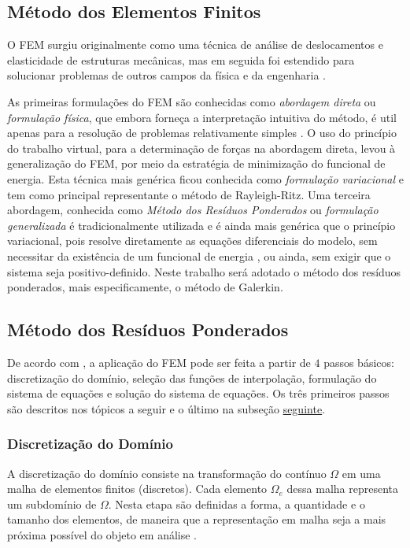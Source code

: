 \documentclass[
    12pt,               %
    openright,          %
    oneside,
    a4paper,            %
    english,            %
    french,             %
    spanish,            %
    brazil              %
    ]{abntex2}
\begin{document}
\subsection{Método dos Elementos Finitos}

O FEM surgiu originalmente como uma técnica de análise de deslocamentos e elasticidade de estruturas mecânicas, mas em seguida foi estendido para solucionar problemas de outros campos da física e da engenharia \cite{jin, desai, zien}.

As primeiras formulações do FEM são conhecidas como \textit{abordagem direta} ou \textit{formulação física}, que embora forneça a interpretação intuitiva do método, é util apenas para a resolução de problemas relativamente simples \cite{huebner, desai, zien}. O uso do princípio do trabalho virtual, para a determinação de forças na abordagem direta, levou à generalização do FEM, por meio da estratégia de minimização do funcional de energia. Esta técnica mais genérica  ficou conhecida como \textit{formulação variacional} \cite{desai, zien, jin} e tem como principal representante o método de Rayleigh-Ritz. Uma terceira abordagem, conhecida como \textit{Método dos Resíduos Ponderados} ou \textit{formulação generalizada} \cite{zien, huebner} é tradicionalmente utilizada e é ainda mais genérica que o princípio variacional, pois resolve diretamente as equações diferenciais do modelo, sem necessitar da existência de um funcional de energia \cite{desai}, ou ainda, sem exigir que o sistema seja positivo-definido. Neste trabalho será adotado o método dos resíduos ponderados, mais especificamente, o método de Galerkin.


\subsection{Método dos Resíduos Ponderados}
\label{sec:proc}

De acordo com , a aplicação do FEM pode ser feita a partir de $4$ passos básicos: discretização do domínio, seleção das funções de interpolação, formulação do sistema de equações e solução do sistema de equações. Os três primeiros passos são descritos nos tópicos a seguir e o último na subseção \hyperref[sec:CG]{seguinte}.


\subsubsection*{Discretização do Domínio} 
A discretização do domínio consiste na transformação do contínuo $\Omega$ em uma malha de elementos finitos (discretos). Cada elemento $\Omega_e$ dessa malha representa um subdomínio de $\Omega$.  
Nesta etapa são definidas a forma, a quantidade e o tamanho dos elementos, de maneira que a representação em malha seja a mais próxima possível do objeto em análise \cite{desai}.
\end{document}
